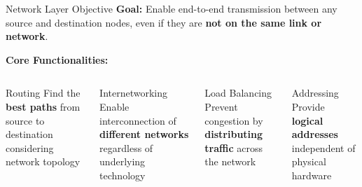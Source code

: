\documentclass[aspectratio=169,11pt]{beamer}
\begin{document}
\begin{frame}{Network Layer Objective}
    \textbf{Goal:} Enable end-to-end transmission between any source and destination nodes, even if they are \textbf{not on the same link or network}.
    
    \vspace{0.5cm}
    \textbf{Core Functionalities:}
    \begin{columns}
        \begin{block}{Routing}
            Find the \textbf{best paths} from source to destination considering network topology
        \end{block}
        
        \begin{block}{Internetworking}
            Enable interconnection of \textbf{different networks} regardless of underlying technology
        \end{block}
        
        \begin{block}{Load Balancing}
            Prevent congestion by \textbf{distributing traffic} across the network
        \end{block}
        
        \begin{block}{Addressing}
            Provide \textbf{logical addresses} independent of physical hardware
        \end{block}
    \end{columns}
\end{frame}
\end{document}

